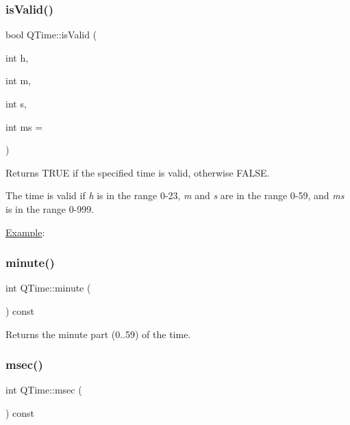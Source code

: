 \subsubsection{\texorpdfstring{isValid()}{isValid()}\hspace{0.1cm}{\footnotesize\ttfamily [2/2]}}
{\footnotesize\ttfamily bool Q\+Time\+::is\+Valid (\begin{DoxyParamCaption}\item[{int}]{h,  }\item[{int}]{m,  }\item[{int}]{s,  }\item[{int}]{ms = {} }\end{DoxyParamCaption})\hspace{0.3cm}{\ttfamily [static]}}

Returns T\+R\+UE if the specified time is valid, otherwise F\+A\+L\+SE.

The time is valid if {\itshape h} is in the range 0-\/23, {\itshape m} and {\itshape s} are in the range 0-\/59, and {\itshape ms} is in the range 0-\/999.

\mbox{\hyperlink{struct_example}{Example}}\+: 
\begin{DoxyCode}{0}
\end{DoxyCode}
 \mbox{\label{class_q_time_a229f09c7a639dc11990463d827fa5137}} 
\subsubsection{\texorpdfstring{minute()}{minute()}}
{\footnotesize\ttfamily int Q\+Time\+::minute (\begin{DoxyParamCaption}{ }\end{DoxyParamCaption}) const}

Returns the minute part (0..59) of the time. \mbox{\label{class_q_time_a88ab10ec33b877a15bb0d0c7971de90e}} 
\subsubsection{\texorpdfstring{msec()}{msec()}}
{\footnotesize\ttfamily int Q\+Time\+::msec (\begin{DoxyParamCaption}{ }\end{DoxyParamCaption}) const}


